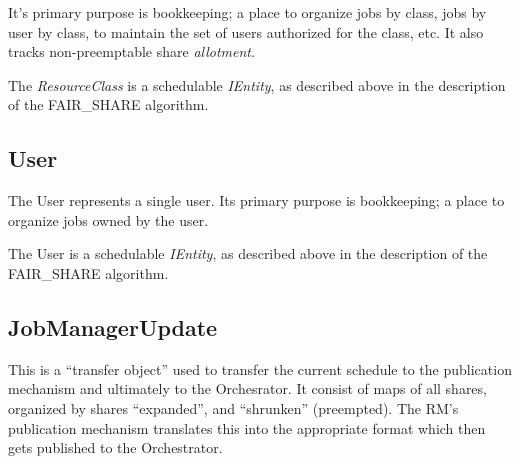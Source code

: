     It's primary purpose is bookkeeping; a place to organize jobs by class, jobs by user by class,
    to maintain the set of users authorized for the class, etc.  It also tracks non-preemptable
    share {\em allotment}.

    The {\em ResourceClass} is a schedulable {\em IEntity}, as described above in the description
    of the FAIR\_SHARE algorithm.

\subsection{User}

    The User represents a single user. Its primary purpose is bookkeeping; a place to organize
    jobs owned by the user.

    The User is a schedulable {\em IEntity}, as described above in the description of the 
    FAIR\_SHARE algorithm.

\subsection{JobManagerUpdate}

    This is a ``transfer object'' used to transfer the current schedule to the publication
    mechanism and ultimately to the Orchesrator.  It consist of maps of all shares, organized
    by shares ``expanded'', and ``shrunken'' (preempted).  The RM's publication mechanism
    translates this into the appropriate format which then gets published to the Orchestrator.
    
